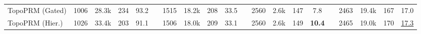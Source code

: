 \begin{table}[!htb]
{\begin{tabular}{@{}l cccc c cccc c cccc c cccc@{}}
TopoPRM (Gated)
  & 1006          & 28.3k          & 234          & 93.2
  && 1515          & 18.2k          & 208          & 33.5
  && 2560          & 2.6k           & 147          & 7.8
  && 2463          & 19.4k          & 167          & 17.0 \\
\rowcolor{blue!5}
TopoPRM (Hier.)
  & 1026          & 33.4k          & 203          & 91.1
  && 1506          & 18.0k          & 209          & 33.1
  && 2560          & 2.6k           & 149          & \textbf{10.4}
  && 2465          & 19.0k          & 170          & \underline{17.3} \\
\bottomrule
\end{tabular}%
}
\end{table}

